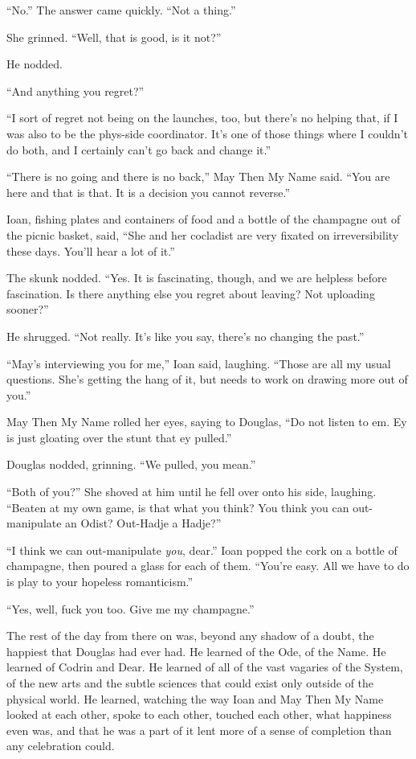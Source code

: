 ``No.'' The answer came quickly. ``Not a thing.''

She grinned. ``Well, that is good, is it not?''

He nodded.

``And anything you regret?''

``I sort of regret not being on the launches, too, but there's no helping that, if I was also to be the phys-side coordinator. It's one of those things where I couldn't do both, and I certainly can't go back and change it.''

``There is no going and there is no back,'' May Then My Name said. ``You are here and that is that. It is a decision you cannot reverse.''

Ioan, fishing plates and containers of food and a bottle of the champagne out of the picnic basket, said, ``She and her cocladist are very fixated on irreversibility these days. You'll hear a lot of it.''

The skunk nodded. ``Yes. It is fascinating, though, and we are helpless before fascination. Is there anything else you regret about leaving? Not uploading sooner?''

He shrugged. ``Not really. It's like you say, there's no changing the past.''

``May's interviewing you for me,'' Ioan said, laughing. ``Those are all my usual questions. She's getting the hang of it, but needs to work on drawing more out of you.''

May Then My Name rolled her eyes, saying to Douglas, ``Do not listen to em. Ey is just gloating over the stunt that ey pulled.''

Douglas nodded, grinning. ``We pulled, you mean.''

``Both of you?'' She shoved at him until he fell over onto his side, laughing. ``Beaten at my own game, is that what you think? You think you can out-manipulate an Odist? Out-Hadje a Hadje?''

``I think we can out-manipulate \emph{you}, dear.'' Ioan popped the cork on a bottle of champagne, then poured a glass for each of them. ``You're easy. All we have to do is play to your hopeless romanticism.''

``Yes, well, fuck you too. Give me my champagne.''

The rest of the day from there on was, beyond any shadow of a doubt, the happiest that Douglas had ever had. He learned of the Ode, of the Name. He learned of Codrin and Dear. He learned of all of the vast vagaries of the System, of the new arts and the subtle sciences that could exist only outside of the physical world. He learned, watching the way Ioan and May Then My Name looked at each other, spoke to each other, touched each other, what happiness even was, and that he was a part of it lent more of a sense of completion than any celebration could.
